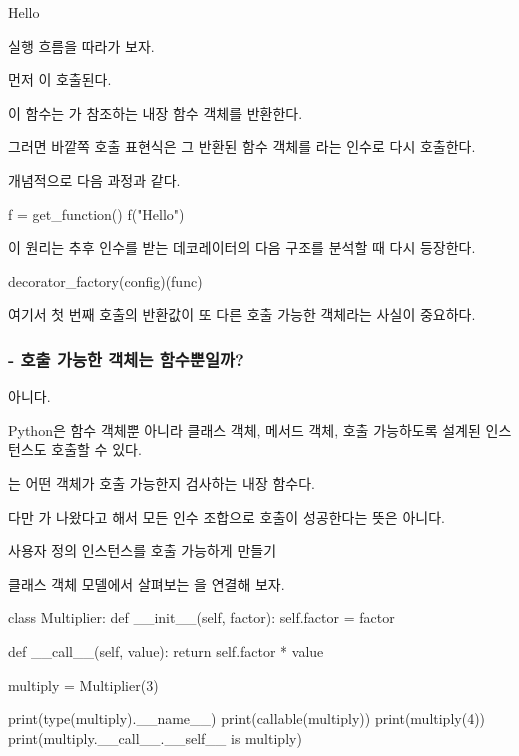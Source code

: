 \begin{dhkzsh}
Hello
\end{dhkzsh}

실행 흐름을 따라가 보자.

먼저 이 호출된다.

이 함수는 가 참조하는 내장 함수 객체를 반환한다.

그러면 바깥쪽 호출 표현식은 그 반환된 함수 객체를 라는 인수로 다시 호출한다.

개념적으로 다음 과정과 같다.

\begin{dhkcode}
f = get_function()
f("Hello")
\end{dhkcode}

이 원리는 추후 인수를 받는 데코레이터의 다음 구조를 분석할 때 다시 등장한다.

\begin{dhkcode}
decorator_factory(config)(func)
\end{dhkcode}

여기서 첫 번째 호출의 반환값이 또 다른 호출 가능한 객체라는 사실이 중요하다.

\subsubsection{ - 호출 가능한 객체는 함수뿐일까?}

아니다.

Python은 함수 객체뿐 아니라 클래스 객체, 메서드 객체, 호출 가능하도록 설계된 인스턴스도 호출할 수 있다.

는 어떤 객체가 호출 가능한지 검사하는 내장 함수다.

다만 가 나왔다고 해서 모든 인수 조합으로 호출이 성공한다는 뜻은 아니다.

\begin{dhknote}
\begin{dhksmry}[centered]
사용자 정의 인스턴스를 호출 가능하게 만들기
\end{dhksmry}
\end{dhknote}

클래스 객체 모델에서 살펴보는 을 연결해 보자.

\begin{dhkcode}
class Multiplier:
    def __init__(self, factor):
        self.factor = factor

    def __call__(self, value):
        return self.factor * value

multiply = Multiplier(3)

print(type(multiply).__name__)
print(callable(multiply))
print(multiply(4))
print(multiply.__call__.__self__ is multiply)
\end{dhkcode}

